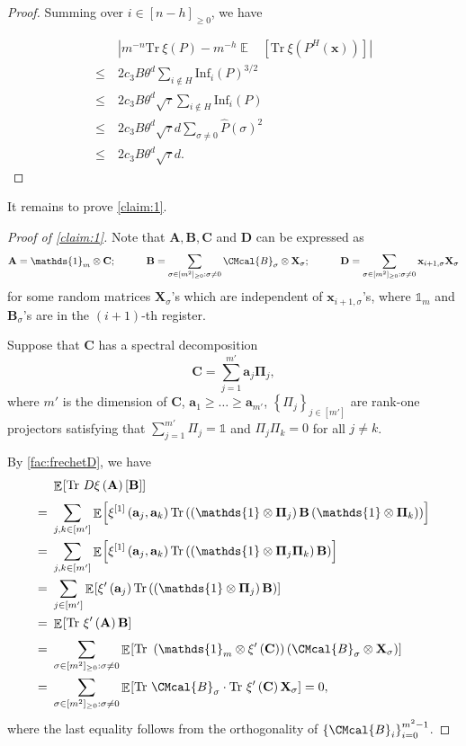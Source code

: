 \documentclass[11pt]{article}
\def\B{\CMcal{B}}
\theoremstyle{plain}
\theoremstyle{definition}
\newcommand {\minusspace} {\: \! \!}
\newcommand {\Fn} [2] {\ensuremath{ #1 \minusspace \Br{ #2 } }}
\newcommand {\set} [1] {\ensuremath{ \left\lbrace #1 \right\rbrace }}
\newcommand {\br} [1] {\ensuremath{ \left( #1 \right) }}
\newcommand {\Br} [1] {\ensuremath{ \left[ #1 \right] }}
\newcommand {\ab} [1] {\ensuremath{ \left| #1 \right| }}
\DeclareMathOperator*{\bigE}{\mathbb{E}}
\newcommand {\expec} [2] {\Fn{\bigE_{\substack{#1}}}{#2}}
\newcommand {\Tr} {\ensuremath{ \mathrm{Tr} }}
\newcommand {\id} {\ensuremath{\mathds{1}}}
\newcommand{\randx}{\ensuremath{\mathbf{x}}}
\newcommand{\randA}{\ensuremath{\mathbf{A}}}
\newcommand{\randB}{\ensuremath{\mathbf{B}}}
\newcommand{\randC}{\ensuremath{\mathbf{C}}}
\newcommand{\randD}{\ensuremath{\mathbf{D}}}
\newcommand{\randa}{\ensuremath{\mathbf{a}}}
\newcommand{\randPi}{\ensuremath{\mathbf{\Pi}}}
\newcommand{\1}{\mathbb{1}} %
\begin{document}
\begin{proof}
	Summing over $i\in[n-h]_{\geq0}$, we have 
	
	\begin{align*}
&\ab{m^{-n}\Tr~\xi\br{P}-m^{-h}\expec{}{\Tr~\xi\br{P^H(\randx)}}}\\
\leq~&2c_3 B \theta^d\sum_{i\notin H}\mathrm{Inf}_{i}\br{P}^{3/2}\\
\leq~&2c_3 B \theta^d\sqrt{\tau}\sum_{i\notin H}\mathrm{Inf}_{i}\br{P}\\
\leq~&2c_3 B \theta^d\sqrt{\tau}d\sum_{\sigma\ne0}\widehat{P}\br{\sigma}^2\\
\leq~&2c_3 B \theta^d\sqrt{\tau}d.
\end{align*}

\end{proof}
It remains to prove \cref{claim:1}.
\begin{proof}[Proof of \cref{claim:1}]
Note that $\mathbf{A},\mathbf{B},\mathbf{C}$ and $\randD$ can be expressed as
	\begin{align*}
	  \mathbf{A} =\id_m\otimes\mathbf{C}; \quad\quad\quad 
	  \mathbf{B} =\sum_{\sigma\in[m^2]_{\geq 0}:\sigma\neq 0}\B_{\sigma}\otimes\mathbf{X}_{\sigma}; \quad\quad\quad
	  \mathbf{D} = \sum_{\sigma\in[m^2]_{\geq 0}:\sigma\neq 0}\randx_{i+1,\sigma}\mathbf{X}_{\sigma}
	\end{align*}
for some random matrices $\mathbf{X}_{\sigma}$'s which are independent of $\randx_{i+1,\sigma}$'s, where $\id_m$ and $\mathbf{B}_{\sigma}$'s are in the $\br{i+1}$-th register.

Suppose that $\randC$ has a spectral decomposition
\begin{equation*}
\randC=\sum_{j=1}^{m'}\randa_j\randPi_j,
\end{equation*}
where $m'$ is the dimension of $\randC$, $\randa_1\geq\dots\geq\randa_{m'}$, $\set{\Pi_j}_{j\in[m']}$ are rank-one projectors satisfying that $\sum_{j=1}^{m'}\Pi_j=\id$ and $\Pi_j\Pi_k=0$ for all $j\ne k$.

By \cref{fac:frechetD}, we have 
\begin{align*}
&\expec{}{\Tr~D\xi\br{\mathbf{A}}\Br{\mathbf{B}}}\\
=~&\sum_{j,k\in[m']}\expec{}{\xi^{[1]}\br{\randa_j,\randa_k}\Tr\br{\br{\id\otimes\randPi_{j}}\randB\br{\id\otimes\randPi_{k}}}}\\
=~&\sum_{j,k\in[m']}\expec{}{\xi^{[1]}\br{\randa_j,\randa_k}\Tr\br{\br{\id\otimes\randPi_{j}\randPi_k}\randB}}\\
=~&\sum_{j\in[m']}\expec{}{\xi'\br{\randa_j}\Tr\br{\br{\id\otimes\randPi_{j}}\randB}}\\
=~&\expec{}{\Tr~\xi'\br{\randA}\randB}\\
=~&\sum_{\sigma\in[m^2]_{\geq 0}:\sigma\neq 0}\expec{}{\Tr~\br{\id_m\otimes\xi'\br{\randC}}\br{\B_{\sigma}\otimes\mathbf{X}_{\sigma}}}\\
=~&\sum_{\sigma\in[m^2]_{\geq 0}:\sigma\neq 0}\expec{}{\Tr~\B_{\sigma}\cdot\Tr~\xi'\br{\randC}\mathbf{X}_{\sigma}}=0,
\end{align*}
where the last equality follows from the orthogonality of $\set{\B_i}_{i=0}^{m^2-1}$.


\end{proof}
\end{document}
